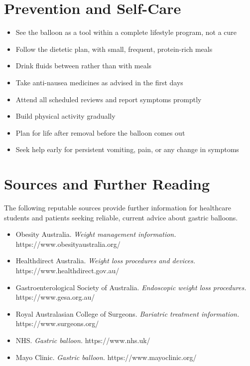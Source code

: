\section*{Prevention and Self-Care}
\begin{itemize}
    \item See the balloon as a tool within a complete lifestyle program, not a cure
    \item Follow the dietetic plan, with small, frequent, protein-rich meals
    \item Drink fluids between rather than with meals
    \item Take anti-nausea medicines as advised in the first days
    \item Attend all scheduled reviews and report symptoms promptly
    \item Build physical activity gradually
    \item Plan for life after removal before the balloon comes out
    \item Seek help early for persistent vomiting, pain, or any change in symptoms
\end{itemize}

\section*{Sources and Further Reading}
The following reputable sources provide further information for healthcare students and patients seeking reliable, current advice about gastric balloons.
\begin{itemize}
    \item Obesity Australia. \textit{Weight management information.} https://www.obesityaustralia.org/
    \item Healthdirect Australia. \textit{Weight loss procedures and devices.} https://www.healthdirect.gov.au/
    \item Gastroenterological Society of Australia. \textit{Endoscopic weight loss procedures.} https://www.gesa.org.au/
    \item Royal Australasian College of Surgeons. \textit{Bariatric treatment information.} https://www.surgeons.org/
    \item NHS. \textit{Gastric balloon.} https://www.nhs.uk/
    \item Mayo Clinic. \textit{Gastric balloon.} https://www.mayoclinic.org/
\end{itemize}
